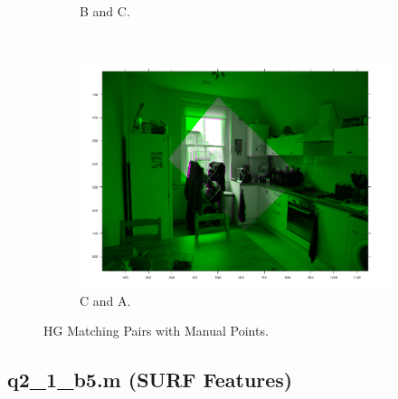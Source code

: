 \documentclass[a4paper, 10pt, conference]{ieeeconf}
\begin{document}
\begin{figure}[!ht]
\begin{subfigure}{0.3\linewidth}
      \caption{B and C.}
    \end{subfigure}
    ~
    \begin{subfigure}{0.3\linewidth}
      \includegraphics[width=\textwidth]{pic/q2_1_b1_CA_pair}
      \caption{C and A.}
    \end{subfigure}

	\caption{HG Matching Pairs with Manual Points.}
\end{figure}


\newpage

\subsection*{q2\_1\_b5.m (SURF Features)}
\end{document}
